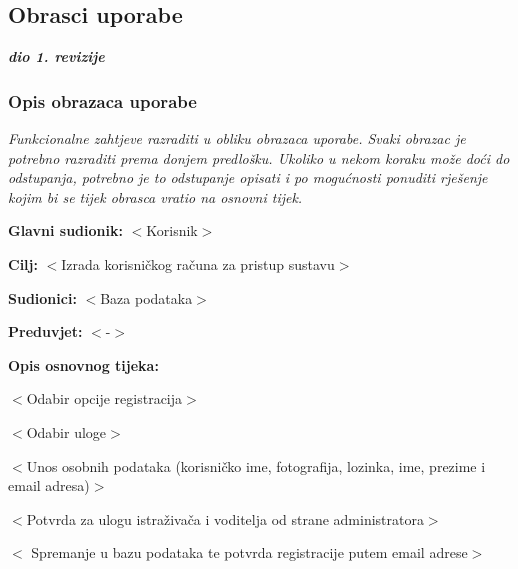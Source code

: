 			
			\eject 
			
			
				
			\subsection{Obrasci uporabe}
				
				\textbf{\textit{dio 1. revizije}}
				
				\subsubsection{Opis obrazaca uporabe}
					\textit{Funkcionalne zahtjeve razraditi u obliku obrazaca uporabe. Svaki obrazac je potrebno razraditi prema donjem predlošku. Ukoliko u nekom koraku može doći do odstupanja, potrebno je to odstupanje opisati i po mogućnosti ponuditi rješenje kojim bi se tijek obrasca vratio na osnovni tijek.}\\
					
					\noindent {}
					\begin{packed_item}
						
						\item \textbf{Glavni sudionik: }$<$Korisnik$>$
						\item  \textbf{Cilj:} $<$Izrada korisničkog računa za pristup sustavu$>$
						\item  \textbf{Sudionici:} $<$Baza podataka$>$
						\item  \textbf{Preduvjet:} $<$-$>$
						\item  \textbf{Opis osnovnog tijeka:}
						
						\item[] \begin{packed_enum}
							
							\item $<$Odabir opcije registracija$>$
							\item $<$Odabir uloge$>$
							\item $<$Unos osobnih podataka (korisničko ime, fotografija, lozinka, ime, prezime i email adresa)$>$
							\item $<$Potvrda za ulogu istraživača i voditelja od strane administratora$>$
							\item $<$
							Spremanje u bazu podataka te potvrda registracije putem email adrese$>$
						
								\end{packed_enum}
						
					\end{packed_item}
					
